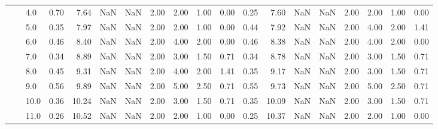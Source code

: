 \begin{tabular}{lllrrrrrrrrrrrrrrrr}
       &     & 4.0  &      0.70 &       7.64 &               NaN &                NaN & 2.00 &   2.00 &             1.00 &                         0.00 &      0.25 &       7.60 &               NaN &                NaN & 2.00 &   2.00 &             1.00 &                         0.00 \\
       &     & 5.0  &      0.35 &       7.97 &               NaN &                NaN & 2.00 &   2.00 &             1.00 &                         0.00 &      0.44 &       7.92 &               NaN &                NaN & 2.00 &   4.00 &             2.00 &                         1.41 \\
       &     & 6.0  &      0.46 &       8.40 &               NaN &                NaN & 2.00 &   4.00 &             2.00 &                         0.00 &      0.46 &       8.38 &               NaN &                NaN & 2.00 &   4.00 &             2.00 &                         0.00 \\
       &     & 7.0  &      0.34 &       8.89 &               NaN &                NaN & 2.00 &   3.00 &             1.50 &                         0.71 &      0.34 &       8.78 &               NaN &                NaN & 2.00 &   3.00 &             1.50 &                         0.71 \\
       &     & 8.0  &      0.45 &       9.31 &               NaN &                NaN & 2.00 &   4.00 &             2.00 &                         1.41 &      0.35 &       9.17 &               NaN &                NaN & 2.00 &   3.00 &             1.50 &                         0.71 \\
       &     & 9.0  &      0.56 &       9.89 &               NaN &                NaN & 2.00 &   5.00 &             2.50 &                         0.71 &      0.55 &       9.73 &               NaN &                NaN & 2.00 &   5.00 &             2.50 &                         0.71 \\
       &     & 10.0 &      0.36 &      10.24 &               NaN &                NaN & 2.00 &   3.00 &             1.50 &                         0.71 &      0.35 &      10.09 &               NaN &                NaN & 2.00 &   3.00 &             1.50 &                         0.71 \\
       &     & 11.0 &      0.26 &      10.52 &               NaN &                NaN & 2.00 &   2.00 &             1.00 &                         0.00 &      0.25 &      10.37 &               NaN &                NaN & 2.00 &   2.00 &             1.00 &                         0.00 \\

\end{tabular}
